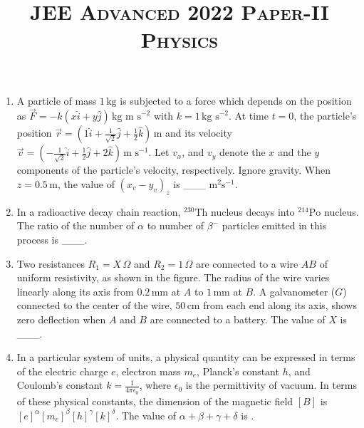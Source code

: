 \documentclass{article}
\title{\textsc{JEE Advanced 2022 Paper-II\\Physics}}
\date{}
\begin{document}
\maketitle

\begin{enumerate}
    \item A particle of mass $1 \, \text{kg}$ is subjected to a force which depends on the position as $\vec{F} = -k(x\hat{i} + y\hat{j}) \, \text{kg m s}^{-2}$ with $k = 1 \, \text{kg s}^{-2}$. At time $t = 0$, the particle's position $\vec{r} = (1\hat{i} + \frac{1}{\sqrt{2}}\hat{j} + \frac{1}{2}\hat{k}) \, \text{m}$ and its velocity $\vec{v} = (-\frac{1}{\sqrt{2}}\hat{i} + \frac{1}{2}\hat{j} + 2\hat{k}) \, \text{m s}^{-1}$. Let $v_x$, and $v_y$ denote the $x$ and the $y$ components of the particle's velocity, respectively. Ignore gravity. When $z = 0.5 \, \text{m}$, the value of $(x_v - y_v)_{z}$ is \_\_\_ $\text{m}^2 \text{s}^{-1}$.
    
    \item In a radioactive decay chain reaction, $^{230}\text{Th}$ nucleus decays into $^{214}\text{Po}$ nucleus. The ratio of the number of $\alpha$ to number of $\beta^-$ particles emitted in this process is \_\_\_.
    
    \item Two resistances $R_1 = X \, \Omega$ and $R_2 = 1 \, \Omega$ are connected to a wire $AB$ of uniform resistivity, as shown in the figure. The radius of the wire varies linearly along its axis from $0.2 \, \text{mm}$ at $A$ to $1 \, \text{mm}$ at $B$. A galvanometer ($G$) connected to the center of the wire, $50 \, \text{cm}$ from each end along its axis, shows zero deflection when $A$ and $B$ are connected to a battery. The value of $X$ is \_\_\_.

    \begin{center}
    \end{center}

    \item In a particular system of units, a physical quantity can be expressed in terms of the electric charge \( e \), electron mass \( m_e \), Planck's constant \( h \), and Coulomb's constant \( k = \frac{1}{4\pi\epsilon_0} \), where \( \epsilon_0 \) is the permittivity of vacuum. In terms of these physical constants, the dimension of the magnetic field \( [B] \) is \( [e]^\alpha[m_e]^\beta[h]^\gamma[k]^\delta \). The value of \( \alpha + \beta + \gamma + \delta \) is \underline{\quad} .
        


\end{enumerate}
\end{document}
